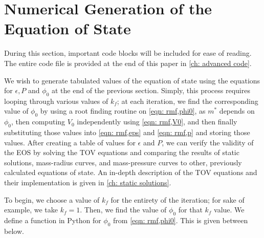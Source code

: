 


\section{Numerical Generation of the Equation of State}

During this section, important code blocks will be included for ease of reading. The entire code file is provided at the end of this paper in \autoref{ch: advanced code}.

We wish to generate tabulated values of the equation of state using the equations for $\epsilon, P$ and $\phi_0$ at the end of the previous section. Simply, this process requires looping through various values of $k_f$; at each iteration, we find the corresponding value of $\phi_0$ by using a root finding routine on \eqref{eqn: rmf,phi0}, as $m^*$ depends on $\phi_0$, then computing $V_0$ independently using \eqref{eqn: rmf,V0}, and then finally substituting those values into \eqref{eqn: rmf,eps} and \eqref{eqn: rmf,p} and storing those values. After creating a table of values for $\epsilon$ and $P$, we can verify the validity of the EOS by solving the TOV equations and comparing the results of static solutions, mass-radius curves, and mass-pressure curves to other, previously calculated equations of state. An in-depth description of the TOV equations and their implementation is given in \autoref{ch: static solutions}.

To begin, we choose a value of $k_f$ for the entirety of the iteration; for sake of example, we take $k_f = 1$. Then, we find the value of $\phi_0$ for that $k_f$ value. We define a function in Python for $\phi_0$ from \eqref{eqn: rmf,phi0}. This is given between below.

